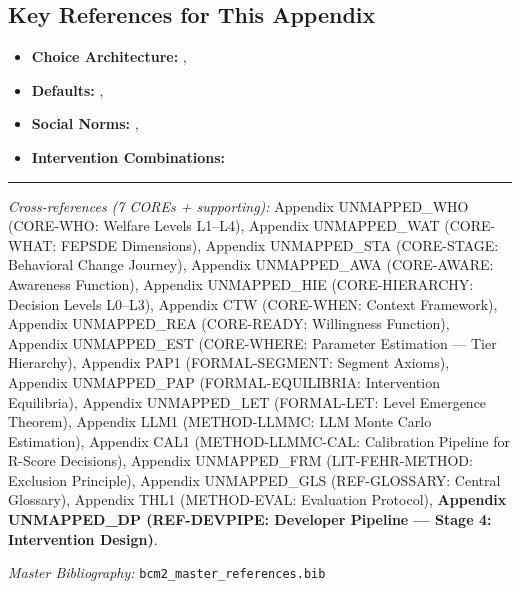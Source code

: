 \subsection{Key References for This Appendix}

\begin{itemize}[nosep]
    \item \textbf{Choice Architecture:} \citet{thalersunstein2008}, \citet{johnson2012}
    \item \textbf{Defaults:} \citet{madrian2001}, \citet{chetty2014}
    \item \textbf{Social Norms:} \citet{allcott2011}, \citet{cialdini2003}
    \item \textbf{Intervention Combinations:} \citet{johnson2021}
\end{itemize}

\nocite{bcm_master}



\vspace{1em}
\hrule
\vspace{0.5em}

\noindent\textit{Cross-references (7 COREs + supporting):}
Appendix UNMAPPED_WHO (CORE-WHO: Welfare Levels L1--L4),
Appendix UNMAPPED_WAT (CORE-WHAT: FEPSDE Dimensions),
Appendix UNMAPPED_STA (CORE-STAGE: Behavioral Change Journey),
Appendix UNMAPPED_AWA (CORE-AWARE: Awareness Function),
Appendix UNMAPPED_HIE (CORE-HIERARCHY: Decision Levels L0--L3),
Appendix CTW (CORE-WHEN: Context Framework),
Appendix UNMAPPED_REA (CORE-READY: Willingness Function),
Appendix UNMAPPED_EST (CORE-WHERE: Parameter Estimation --- Tier Hierarchy),
Appendix PAP1 (FORMAL-SEGMENT: Segment Axioms),
Appendix UNMAPPED_PAP (FORMAL-EQUILIBRIA: Intervention Equilibria),
Appendix UNMAPPED_LET (FORMAL-LET: Level Emergence Theorem),
Appendix LLM1 (METHOD-LLMMC: LLM Monte Carlo Estimation),
Appendix CAL1 (METHOD-LLMMC-CAL: Calibration Pipeline for R-Score Decisions),
Appendix UNMAPPED_FRM (LIT-FEHR-METHOD: Exclusion Principle),
Appendix UNMAPPED_GLS (REF-GLOSSARY: Central Glossary),
Appendix THL1 (METHOD-EVAL: Evaluation Protocol),
\textbf{Appendix UNMAPPED_DP (REF-DEVPIPE: Developer Pipeline --- Stage 4: Intervention Design)}.

\noindent\textit{Master Bibliography:} \texttt{bcm2\_master\_references.bib}


